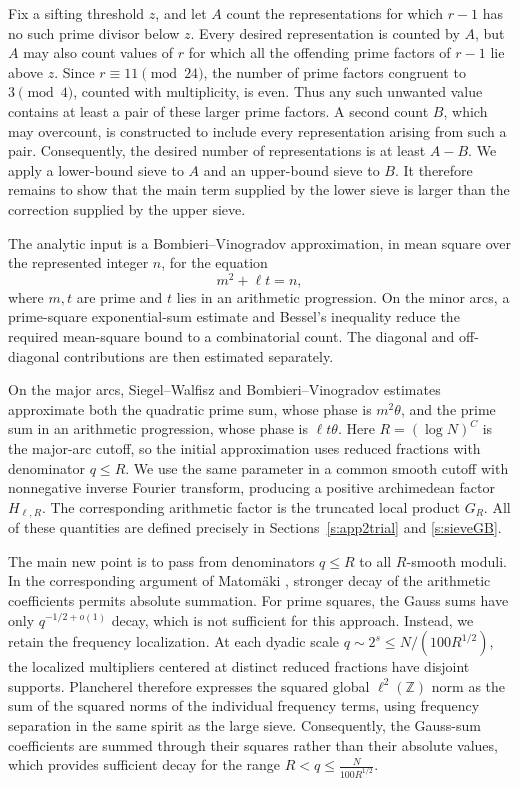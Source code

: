 \documentclass[12pt,reqno]{amsart}
\numberwithin{equation}{section}
\theoremstyle{definition}
\theoremstyle{remark}
\begin{document}
Fix a sifting threshold \(z\), and let \(A\) count the representations
for which \(r-1\) has no such prime divisor below \(z\).  Every desired
representation is counted by \(A\), but \(A\) may also count values of
\(r\) for which all the offending prime factors of \(r-1\) lie above
\(z\).  Since \(r\equiv11\pmod{24}\), the number of prime factors
congruent to \(3\pmod4\), counted with multiplicity, is even.  Thus any
such unwanted value contains at least a pair of these larger prime
factors.  A second count \(B\), which may overcount, is constructed to
include every representation arising from such a pair.  Consequently,
the desired number of representations is at least \(A-B\).
We apply a lower-bound sieve to \(A\) and an upper-bound sieve to \(B\).
It therefore remains to show that the main term supplied by the lower
sieve is larger than the correction supplied by the upper sieve.



The analytic input is a Bombieri--Vinogradov approximation, in mean
square over the represented integer $n$, for the equation
\[
 m^2+\ell t=n,
 \]
where $m,t$ are prime and $t$ lies in an arithmetic progression. On the minor arcs, a prime-square exponential-sum estimate and
Bessel's inequality reduce the required mean-square bound to a
combinatorial count.  The diagonal and off-diagonal contributions are
then estimated separately.

On the major arcs, Siegel--Walfisz and Bombieri--Vinogradov estimates
approximate both the quadratic prime sum, whose phase is
\(m^2\theta\), and the prime sum in an arithmetic progression, whose
phase is \(\ell t\theta\).  Here \(R=(\log N)^C\) is the major-arc
cutoff, so the initial approximation uses reduced fractions with
denominator \(q\leq R\).  We use the same parameter in a common smooth
cutoff with nonnegative inverse Fourier transform, producing a positive
archimedean factor \(H_{\ell,R}\).  The corresponding arithmetic factor
is the truncated local product \(G_R\). All of these quantities are defined precisely in Sections~\ref{s:app2trial} and \ref{s:sieveGB}.

The main new point is to pass from denominators \(q\leq R\) to all
\(R\)-smooth moduli.  In the corresponding argument of Matom\"aki
\cite{motamake}, stronger decay of the arithmetic coefficients permits
absolute summation.  For prime squares, the Gauss sums have only
\(q^{-1/2+o(1)}\) decay, which is not sufficient for this approach.
Instead, we retain the frequency localization. 
At each dyadic scale \(q\sim2^s\leq N/(100R^{1/2})\), the
localized multipliers centered at distinct reduced fractions
have disjoint supports. Plancherel therefore expresses the
squared global \(\ell^2(\mathbb Z)\) norm as the sum of the
squared norms of the individual frequency terms, using
frequency separation in the same spirit as the large sieve.
Consequently, the Gauss-sum coefficients are summed through their
squares rather than their absolute values, which provides sufficient
decay for the range \(R<q\leq \frac{N}{100R^{1/2}}\).
\end{document}
